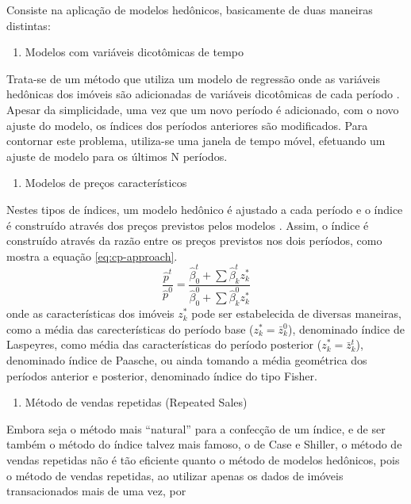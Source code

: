 \documentclass[
	12pt,				%
	oneside,			%
	a4paper,			%
	chapter=TITLE,		%
	section=TITLE,		%
	english,			%
	brazil				%
	]{abntex2}
\begin{document}
Consiste na aplicação de modelos hedônicos, basicamente de duas maneiras
distintas:
\begin{enumerate}
\def\labelenumi{\arabic{enumi}.}
\tightlist
\item
  Modelos com variáveis dicotômicas de tempo
\end{enumerate}
Trata-se de um método que utiliza um modelo de regressão onde as
variáveis hedônicas dos imóveis são adicionadas de variáveis dicotômicas
de cada período \autocite[158]{rppi}. Apesar da simplicidade, uma vez
que um novo período é adicionado, com o novo ajuste do modelo, os
índices dos períodos anteriores são modificados. Para contornar este
problema, utiliza-se uma janela de tempo móvel, efetuando um ajuste de
modelo para os últimos N períodos.
\begin{enumerate}
\def\labelenumi{\arabic{enumi}.}
\setcounter{enumi}{1}
\tightlist
\item
  Modelos de preços característicos
\end{enumerate}
Nestes tipos de índices, um modelo hedônico é ajustado a cada período e
o índice é construído através dos preços previstos pelos modelos
\autocite[53]{rppi}. Assim, o índice é construído através da razão entre
os preços previstos nos dois períodos, como mostra a equação
\eqref{eq:cp-approach}.
\begin{equation}
\frac{\hat p^t}{\hat p^0} = \frac{\hat \beta_0^t + \sum \hat \beta_k^t z_k^*}{\hat \beta_0^0 + \sum \hat \beta_k^0 z_k^*}
\label{eq:cp-approach}
\end{equation}
onde as características dos imóveis \(z_k^*\) pode ser estabelecida de
diversas maneiras, como a média das carecterísticas do período base
(\(z_k^* = \bar z_k^0\)), denominado índice de Laspeyres, como média das
características do período posterior (\(z_k^* = \bar z_k^t\)),
denominado índice de Paasche, ou ainda tomando a média geométrica dos
períodos anterior e posterior, denominado índice do tipo Fisher.
\begin{enumerate}
\def\labelenumi{\alph{enumi}.}
\setcounter{enumi}{2}
\tightlist
\item
  Método de vendas repetidas (Repeated Sales)
\end{enumerate}
Embora seja o método mais ``natural'' para a confecção de um índice, e
de ser também o método do índice talvez mais famoso, o de Case e
Shiller, o método de vendas repetidas não é tão eficiente quanto o
método de modelos hedônicos, pois o método de vendas repetidas, ao
utilizar apenas os dados de imóveis transacionados mais de uma vez, por
\end{document}
